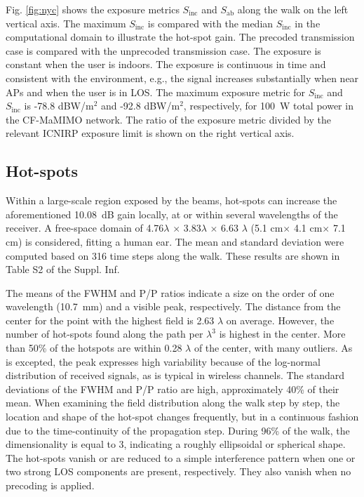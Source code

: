 \documentclass{IEEEtran}
\begin{document}
Fig. \ref{fig:nyc} shows the exposure metrics $S_\mathrm{inc}$ and $S_\mathrm{ab}$ along the walk on the left vertical axis. The maximum $S_\mathrm{inc}$ is compared with the median $S_\mathrm{inc}$ in the computational domain to illustrate the hot-spot gain. The precoded transmission case is compared with the unprecoded transmission case. The exposure is constant when the user is indoors. The exposure is continuous in time and consistent with the environment, e.g., the signal increases substantially when near \glspl{AP} and when the user is in LOS. The maximum exposure metric for $S_\mathrm{inc}$ and $S_\mathrm{inc}$ is -78.8 dBW/m$^2$ and -92.8 dBW/m$^2$, respectively, for 100~W total power in the \gls{CF-MaMIMO} network. The ratio of the exposure metric divided by the relevant \gls{ICNIRP} exposure limit is shown on the right vertical axis.

\subsection{Hot-spots}
Within a large-scale region exposed by the beams, hot-spots can increase the aforementioned 10.08~dB gain locally, at or within several wavelengths of the receiver. A free-space domain of 4.76$\lambda$ $\times$ 3.83$\lambda$ $\times$ 6.63 $\lambda$ (5.1 cm$\times$ 4.1 cm$\times$ 7.1 cm) is considered, fitting a human ear. The mean and standard deviation were computed based on 316 time steps along the walk. These results are shown in Table S2 of the Suppl. Inf.

The means of the \gls{FWHM} and \gls{P/P} ratios indicate a size on the order of one wavelength (10.7~mm) and a visible peak, respectively. The distance from the center for the point with the highest field is 2.63 $\lambda$ on average. However, the number of hot-spots found along the path per $\lambda^3$ is highest in the center. More than 50\% of the hotspots are within 0.28 $\lambda$ of the center, with many outliers. As is excepted, the peak expresses high variability because of the log-normal distribution of received signals, as is typical in wireless channels. The standard deviations of the \gls{FWHM} and \gls{P/P} ratio are high, approximately 40\% of their mean. When examining the field distribution along the walk step by step, the location and shape of the hot-spot changes frequently, but in a continuous fashion due to the time-continuity of the propagation step. During 96\% of the walk, the dimensionality is equal to 3, indicating a roughly ellipsoidal or spherical shape. The hot-spots vanish or are reduced to a simple interference pattern when one or two strong LOS components are present, respectively. They also vanish when no precoding is applied. \\
\end{document}

